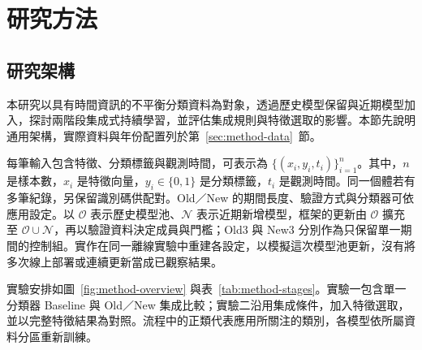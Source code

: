 \chapter{研究方法}\label{chap:method}
\begingroup
\setlength{\emergencystretch}{2em}

\section{研究架構}\label{sec:method-framework}

本研究以具有時間資訊的不平衡分類資料為對象，透過歷史模型保留與近期模型加入，探討兩階段集成式持續學習，並評估集成規則與特徵選取的影響。本節先說明通用架構，實際資料與年份配置列於第~\ref{sec:method-data}~節。

每筆輸入包含特徵、分類標籤與觀測時間，可表示為 \(\{(x_i,y_i,t_i)\}_{i=1}^{n}\)。其中，\(n\) 是樣本數，\(x_i\) 是特徵向量，\(y_i\in\{0,1\}\) 是分類標籤，\(t_i\) 是觀測時間。同一個體若有多筆紀錄，另保留識別碼供配對。Old／New 的期間長度、驗證方式與分類器可依應用設定。以 \(\mathcal{O}\) 表示歷史模型池、\(\mathcal{N}\) 表示近期新增模型，框架的更新由 \(\mathcal{O}\) 擴充至 \(\mathcal{O}\cup\mathcal{N}\)，再以驗證資料決定成員與門檻；Old3 與 New3 分別作為只保留單一期間的控制組。實作在同一離線實驗中重建各設定，以模擬這次模型池更新，沒有將多次線上部署或連續更新當成已觀察結果。

實驗安排如圖~\ref{fig:method-overview} 與表~\ref{tab:method-stages}。實驗一包含單一分類器 Baseline 與 Old／New 集成比較；實驗二沿用集成條件，加入特徵選取，並以完整特徵結果為對照。流程中的正類代表應用所關注的類別，各模型依所屬資料分區重新訓練。

